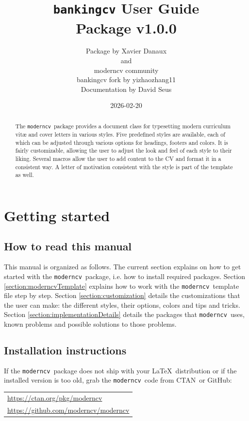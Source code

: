 \documentclass[a4paper, 11pt]{article}
\title{%
  \texttt{bankingcv} User Guide\\
  {\small Package v1.0.0}%
}
\author{%
  Package by Xavier Danaux\\
  and\\
  moderncv community\\
  bankingcv fork by yizhaozhang11\\
  {\small Documentation by David Seus}%
}
\date{2026-02-20}
\newcommand{\code}[1]{\lstinline!#1!}
\newcommand{\moderncv}{\code{moderncv}}
\newcommand{\Moderncv}{\moderncv~}
\newcommand{\github}{GitHub}
\newcommand{\ctan}{CTAN}
\newcommand{\Ctan}{\ctan~}
\newcommand{\Latex}{\LaTeX~}
\newcommand{\moderncvGithub}{\url{https://github.com/moderncv/moderncv}}
\newcommand{\moderncvCtan}{\url{https://ctan.org/pkg/moderncv}}
\begin{document}
\maketitle
\begin{abstract}
  \noindent
  The \Moderncv package provides a document class for typesetting modern curriculum vit\ae{} and cover letters in various styles.
  Five predefined styles are available, each of which can be adjusted through various options for headings, footers and colors.
  It is fairly customizable, allowing the user to adjust the look and feel of each style to their liking.
  Several macros allow the user to add content to the CV and format it in a consistent way.
  A letter of motivation consistent with the style is part of the template as well.
\end{abstract}
\tableofcontents



\section{Getting started}
\subsection{How to read this manual}
This manual is organized as follows.
The current section explains on how to get started with the \Moderncv package, i.e. how to install required packages.
Section \ref{section:moderncvTemplate} explains how to work with the \Moderncv template file step by step.
Section \ref{section:customization} details the customizations that the user can make: the different styles, their options, colors and tips and tricks.
Section \ref{section:implementationDetails} details the packages that \Moderncv uses, known problems and possible solutions to those problems.

\subsection{Installation instructions}
If the \Moderncv package does not ship with your \Latex distribution or if the installed version is too old, grab the \Moderncv code from \Ctan or \github:

\begin{tabular}{l}
  \moderncvCtan \\%
  \moderncvGithub
\end{tabular}
\end{document}
